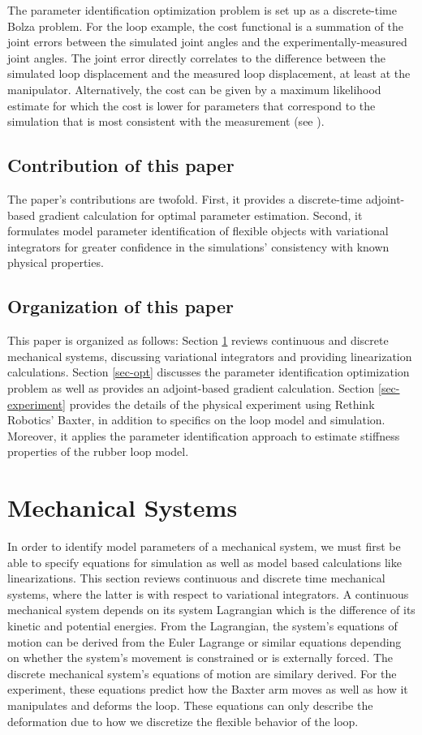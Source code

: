\documentclass[letterpaper, 10pt, conference]{ieeeconf}
\begin{document}
The parameter identification optimization problem is set up as a discrete-time Bolza problem.  For the loop example, the cost functional is a summation of the joint errors between the simulated joint angles and the experimentally-measured joint angles.  The joint error directly correlates to the difference between the simulated loop displacement and the measured loop displacement, at least at the manipulator.  Alternatively, the cost can be given by a maximum likelihood estimate for which the cost is lower for parameters that correspond to the simulation that is most consistent with the measurement (see \cite{houska_etal}).  

\subsection{Contribution of this paper}
The paper's contributions are twofold.  First, it provides a discrete-time adjoint-based gradient calculation for optimal parameter estimation.  Second, it formulates model parameter identification of flexible objects with variational integrators for greater confidence in the simulations' consistency with known physical properties.

\subsection{Organization of this paper}
This paper is organized as follows: Section \ref{sec-sys} reviews continuous and discrete mechanical systems, discussing variational integrators and providing linearization calculations.  Section \ref{sec-opt} discusses the parameter identification optimization problem as well as provides an adjoint-based gradient calculation.  Section \ref{sec-experiment} provides the details of the physical experiment using Rethink Robotics' Baxter, in addition to specifics on the loop model and simulation.  Moreover, it applies the parameter identification approach to estimate stiffness properties of the rubber loop model.

\section{Mechanical Systems}
\label{sec-sys}
In order to identify model parameters of a mechanical system, we must first be able to specify equations for simulation as well as model based calculations like linearizations.  This section reviews continuous and discrete time mechanical systems, where the latter is with respect to variational integrators.  A continuous mechanical system depends on its system Lagrangian which is the difference of its kinetic and potential energies.  From the Lagrangian, the system's equations of motion can be derived from the Euler Lagrange or similar equations depending on whether the system's movement is constrained or is externally forced.  The discrete mechanical system's equations of motion are similary derived.  For the experiment, these equations predict how the Baxter arm moves as well as how it manipulates and deforms the loop.  These equations can only describe the deformation due to how we discretize the flexible behavior of the loop.
\end{document}
